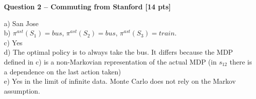 \newpage
\textbf{\Large Question 2 -- Commuting from Stanford \hfill [14 pts]}
\vspace{0.5cm}

a) San Jose \\
b) $\pi^{ast}(S_1) = bus$, $\pi^{ast}(S_2) = bus$, $\pi^{ast}(S_3) = train$. \\
c) Yes \\
d) The optimal policy is to always take the bus. It differs because the MDP defined in c) is a non-Markovian representation of the actual MDP (in $s_{12}$ there is a dependence on the last action taken) \\
e) Yes in the limit of infinite data. Monte Carlo does not rely on the Markov assumption. \\